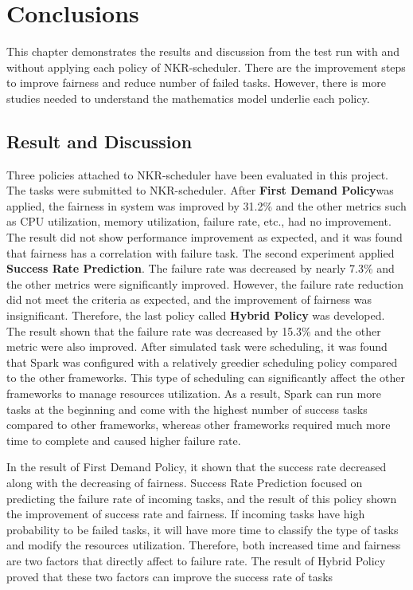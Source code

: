 \documentclass[12pt,oneside,openright,a4paper]{cpe-english-project}
\begin{document}
\chapter{Conclusions}

\hspace{10mm}This chapter demonstrates the results and discussion from the test run with and without applying each policy of NKR-scheduler. There are the improvement steps to improve fairness and reduce number of failed tasks. However, there is more studies needed to understand the mathematics model underlie each policy.

\section{Result and Discussion}
\hspace{10mm}Three policies attached to NKR-scheduler have been evaluated in this project. The tasks were submitted to NKR-scheduler. After \textbf{First Demand Policy}was applied, the fairness in system was improved by 31.2\% and the other metrics such as CPU utilization, memory utilization, failure rate, etc., had no improvement. The result did not show performance improvement as expected, and it was found that fairness has a correlation with failure task. The second experiment applied \textbf{Success Rate Prediction}. The failure rate was decreased by nearly 7.3\% and the other metrics were significantly improved. However, the failure rate reduction did not meet the criteria as expected, and the improvement of fairness was insignificant. Therefore, the last policy called \textbf{Hybrid Policy} was developed. The result shown that the failure rate was decreased by 15.3\% and the other metric were also improved. After simulated task were scheduling, it was found that Spark was configured with a relatively greedier scheduling policy compared to the other frameworks. This type of scheduling can significantly affect the other frameworks to manage resources utilization. As a result, Spark can run more tasks at the beginning and come with the highest number of success tasks compared to other frameworks, whereas other frameworks required much more time to complete and caused higher failure rate. 

\hspace{10mm}In the result of First Demand Policy, it shown that the success rate decreased along with the decreasing of fairness. Success Rate Prediction focused on predicting the failure rate of incoming tasks, and the result of this policy shown the improvement of success rate and fairness. If incoming tasks have high probability to be failed tasks, it will have more time to classify the type of tasks and modify the resources utilization. Therefore, both increased time and fairness are two factors that directly affect to failure rate. The result of Hybrid Policy proved that these two factors can improve the success rate of tasks
\end{document}
